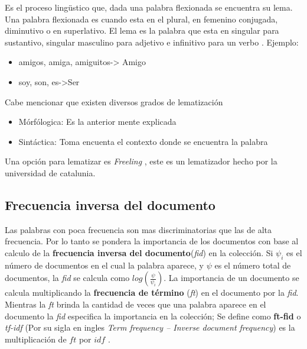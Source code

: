 Es el proceso lingüstico que, dada una palabra flexionada se encuentra su
lema. Una palabra flexionada es cuando esta en el plural, en femenino conjugada,
diminutivo o en superlativo. El lema es la palabra que esta en singular para
sustantivo, singular masculino para adjetivo e infinitivo para un verbo \citep{CT13}. Ejemplo:

	\begin{itemize}
		\item amigos, amiga, amiguitos-> Amigo
		\item soy, son, es->Ser
	\end{itemize}

Cabe mencionar que existen diversos grados de lematización

	\begin{itemize}
		\item Mórfólogica: Es la anterior mente explicada
		\item Sintáctica: Toma encuenta el contexto donde se encuentra la palabra

	\end{itemize}

Una opción para lematizar es \textit{Freeling} \citep{CT18}, este es un lematizador hecho por la
universidad de catalunia.


\subsection{Frecuencia inversa del documento}

Las palabras con poca frecuencia son mas discriminatorias que las de alta frecuencia. Por lo tanto se pondera la importancia de los documentos con base al calculo de la \textbf{frecuencia inversa del documento}(\textit{fid}) en la colección. Si $\psi_i$ es el número de documentos en el cual la palabra aparece, y $\psi$ es el número total de documentos, la \textit{fid} se calcula como $log(\frac{\psi}{\psi_i})$. La importancia de un documento se calcula multiplicando la \textbf{frecuencia de término} (\textit{ft}) en el documento por la \textit{fid}. Mientras la \textit{ft} brinda la cantidad de veces  que una palabra aparece en el documento la \textit{fid} especifica la importancia en la colección; Se define como \textbf{ft-fid} o \textit{tf-idf} (Por su sigla en ingles \textit{Term frequency – Inverse document frequency}) es la multiplicación de $ft$ por $idf$ \citep{CD1}.




